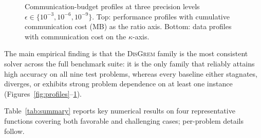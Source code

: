 \documentclass[review,onefignum,onetabnum]{siamart171218}
\begin{document}
	\begin{figure}[htbp]
		\centering
		\caption{Communication-budget profiles at three precision levels
			$\epsilon\in\{10^{-3},10^{-6},10^{-9}\}$.
			Top: performance profiles with cumulative communication cost (MB)
			as the ratio axis.
			Bottom: data profiles with communication cost on the $\kappa$-axis.}
		\label{fig:profiles_comm}
	\end{figure}
	The main empirical finding is that the \textsc{DisGrem} family is the
	most consistent solver across the full benchmark suite:
	it is the only family that reliably attains high accuracy on all nine
	test problems, whereas every baseline either stagnates, diverges, or
	exhibits strong problem dependence on at least one instance
	(Figures~\ref{fig:profiles}--\ref{fig:profiles_comm}).
	
	Table~\ref{tab:summary} reports key numerical results on four
	representative functions covering both favorable and challenging
	cases; per-problem details follow.
	
\end{document}
